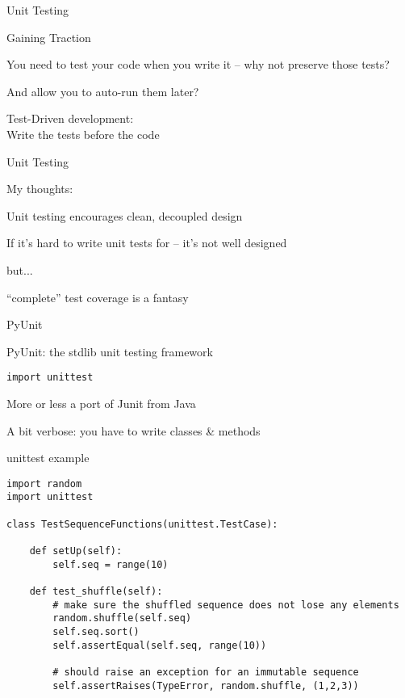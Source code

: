 \documentclass{beamer}
\begin{document}
\begin{frame}[fragile]{Unit Testing}

{\LARGE Gaining Traction}

\vfill
{\Large You need to test your code when you write it -- why not preserve those tests?}

\vfill
{\Large And allow you to auto-run them later?}

\vfill
{\LARGE Test-Driven development:}\\[0.1in]
{\Large \hspace{0.3in} Write the tests before the code}

\end{frame} 

\begin{frame}[fragile]{Unit Testing}

{\LARGE My thoughts:}

\vfill
{\Large Unit testing encourages clean, decoupled design}

\vfill
{\Large If it's hard to write unit tests for -- it's not well designed}

\vfill
{\Large but...}

\vfill
{\Large ``complete'' test coverage is a fantasy}

\end{frame} 


\begin{frame}[fragile]{PyUnit}

{\LARGE PyUnit: the stdlib unit testing framework}

\vfill
{\Large \verb|import unittest|}

\vfill
{\Large More or less a port of Junit from Java}

\vfill
{\Large A bit verbose: you have to write classes \& methods}

\end{frame} 

\begin{frame}[fragile]{unittest example}

{\small
\begin{verbatim}
import random
import unittest

class TestSequenceFunctions(unittest.TestCase):

    def setUp(self):
        self.seq = range(10)

    def test_shuffle(self):
        # make sure the shuffled sequence does not lose any elements
        random.shuffle(self.seq)
        self.seq.sort()
        self.assertEqual(self.seq, range(10))

        # should raise an exception for an immutable sequence
        self.assertRaises(TypeError, random.shuffle, (1,2,3))
\end{verbatim}
}

\end{frame} 
\end{document}
